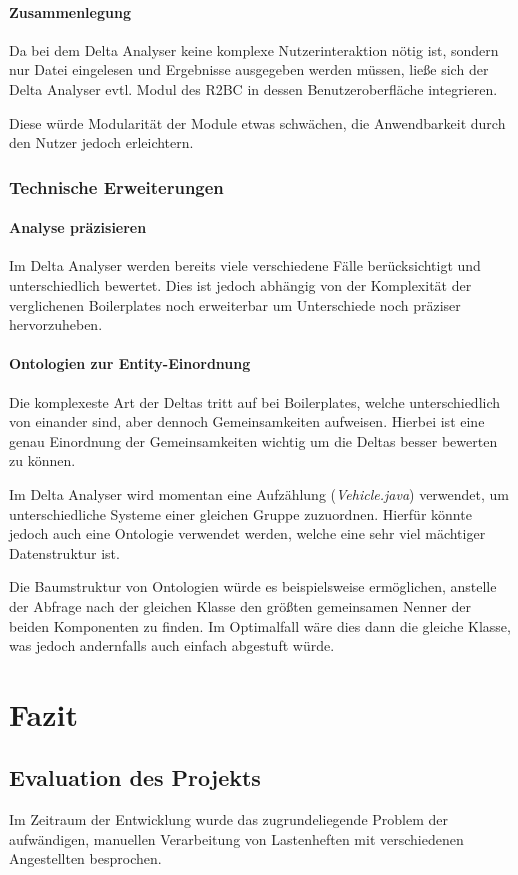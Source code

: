 \documentclass[12pt]{report}
\begin{document}
\subsubsection{Zusammenlegung}
Da bei dem Delta Analyser keine komplexe Nutzerinteraktion nötig ist, sondern nur Datei eingelesen und Ergebnisse ausgegeben werden müssen, ließe sich der Delta Analyser evtl. Modul des R2BC in dessen Benutzeroberfläche integrieren. 

Diese würde Modularität der Module etwas schwächen, die Anwendbarkeit durch den Nutzer jedoch erleichtern.
\subsection{Technische Erweiterungen}
\subsubsection{Analyse präzisieren}
Im Delta Analyser werden bereits viele verschiedene Fälle berücksichtigt und unterschiedlich bewertet. Dies ist jedoch abhängig von der Komplexität der verglichenen Boilerplates noch erweiterbar um Unterschiede noch präziser hervorzuheben. 
\subsubsection{Ontologien zur Entity-Einordnung}
Die komplexeste Art der Deltas tritt auf bei Boilerplates, welche unterschiedlich von einander sind, aber dennoch Gemeinsamkeiten aufweisen. Hierbei ist eine genau Einordnung der Gemeinsamkeiten wichtig um die Deltas besser bewerten zu können. 

Im Delta Analyser wird momentan eine Aufzählung (\textit{Vehicle.java}) verwendet, um unterschiedliche Systeme einer gleichen Gruppe zuzuordnen. Hierfür könnte jedoch auch eine Ontologie verwendet werden, welche eine sehr viel mächtiger Datenstruktur ist. 

Die Baumstruktur von Ontologien würde es beispielsweise ermöglichen, anstelle der Abfrage nach der gleichen Klasse den \glqq größten gemeinsamen Nenner\grqq{} der beiden Komponenten zu finden. Im Optimalfall wäre dies dann die gleiche Klasse, was jedoch andernfalls auch einfach abgestuft würde.

\chapter{Fazit}
\section{Evaluation des Projekts}
Im Zeitraum der Entwicklung wurde das zugrundeliegende Problem der aufwändigen, manuellen Verarbeitung von Lastenheften mit verschiedenen Angestellten besprochen. 
\end{document}
